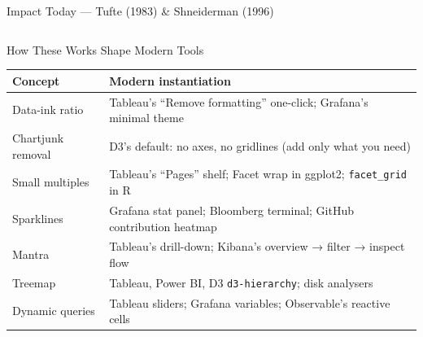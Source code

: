 \documentclass[aspectratio=169,10pt]{beamer}
\begin{document}
\begin{frame}{Impact Today — Tufte (1983) \& Shneiderman (1996)}
  \begin{columns}[T]
      \begin{block}{How These Works Shape Modern Tools}
        \renewcommand{\arraystretch}{1.2}
        \begin{tabular}{@{}p{2.5cm}p{4.2cm}@{}}
          \toprule
          \textbf{Concept} & \textbf{Modern instantiation} \\
          \midrule
          Data-ink ratio    & Tableau's ``Remove formatting''
                              one-click; Grafana's minimal theme \\
          Chartjunk removal & D3's default: no axes, no gridlines
                              (add only what you need) \\
          Small multiples   & Tableau's ``Pages'' shelf; Facet wrap
                              in ggplot2; \texttt{facet\_grid} in R \\
          Sparklines        & Grafana stat panel; Bloomberg terminal;
                              GitHub contribution heatmap \\
          Mantra            & Tableau's drill-down; Kibana's
                              overview → filter → inspect flow \\
          Treemap           & Tableau, Power BI, D3 \texttt{d3-hierarchy};
                              disk analysers \\
          Dynamic queries   & Tableau sliders; Grafana variables;
                              Observable's reactive cells \\
          \bottomrule
        \end{tabular}
      \end{block}


\end{columns}
\end{frame}
\end{document}
